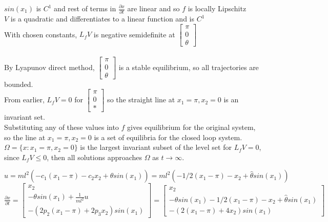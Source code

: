 \documentclass[12pt,letter]{article}
\begin{document}
\begin{itemize}
  $sin(x_1)$ is $C^1$ and rest of terms in $\frac{\partial x}{\partial t}$ are linear and so $f$ is locally Lipschitz\\

  $V$ is a quadratic and differentiates to a linear function and is $C^1$\\

  With chosen constants, $L_fV$ is negative semidefinite at $\begin{bmatrix}
    \pi \\ 0 \\ \theta
  \end{bmatrix}$\\
  \\
  By Lyapunov direct method, $\begin{bmatrix}
    \pi \\ 0 \\ \theta
  \end{bmatrix}$ is a stable equilibrium, so all trajectories are bounded.\\

  From earlier, $L_fV = 0$ for
  $\begin{bmatrix}
    \pi \\ 0 \\ *
  \end{bmatrix}$ so the straight line at $x_1=\pi, x_2=0$ is an invariant set.\\
  
  Substituting any of these values into $f$ gives equilibrium for the original system, so the line at $x_1=\pi, x_2=0$ is a set of equilibria for the closed loop system.\\

  $\Omega=\{x: x_1=\pi, x_2=0\}$ is the largest invariant subset of the level set for $L_fV=0$, since $L_fV \leq 0$, then all solutions approaches $\Omega$ as $t \to \infty$.

  $u=ml^2(-c_1(x_1-\pi)-c_2x_2+\hat{\theta}sin(x_1))=ml^2(-1/2(x_1-\pi)-x_2+\hat{\theta}sin(x_1))$\\

  $\frac{\partial x}{\partial t} =
  \begin{bmatrix}
    x_2\\
    -\theta sin(x_1)+\frac{1}{ml^2}u\\
    -(2p_2(x_1-\pi)+2p_3x_2)sin(x_1)
  \end{bmatrix}=
  \begin{bmatrix}
    x_2\\
    -\theta sin(x_1)-1/2(x_1-\pi)-x_2+\hat{\theta}sin(x_1)\\
    -(2(x_1-\pi)+4x_2)sin(x_1)
  \end{bmatrix}
  $\\
  

\end{itemize}
\end{document}
